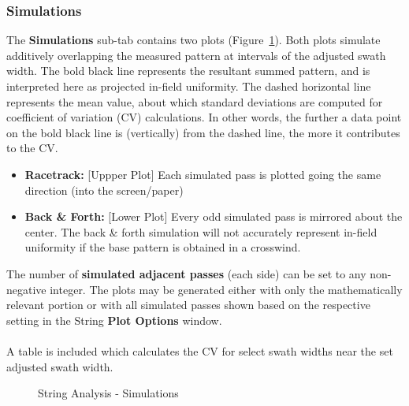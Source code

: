 \documentclass[10pt,letterpaper,titlepage]{article}
\begin{document}
    \subsubsection{Simulations}
    The \textbf{Simulations} sub-tab contains two plots (Figure~\ref{fig:string_simulations}). Both plots simulate additively overlapping the measured pattern at intervals of the adjusted swath width. The bold black line represents the resultant summed pattern, and is interpreted here as projected in-field uniformity. The dashed horizontal line represents the mean value, about which standard deviations are computed for coefficient of variation (CV) calculations. In other words, the further a data point on the bold black line is (vertically) from the dashed line, the more it contributes to the CV.
    \begin{itemize}
        \item \textbf{Racetrack:} [Uppper Plot] Each simulated pass is plotted going the same direction (into the screen/paper)
        \item \textbf{Back \& Forth:} [Lower Plot] Every odd simulated pass is mirrored about the center. \color{red} The back \& forth simulation will not accurately represent in-field uniformity if the base pattern is obtained in a crosswind. \color{black}
    \end{itemize}
    The number of \textbf{simulated adjacent passes} (each side) can be set to any non-negative integer. The plots may be generated either with only the mathematically relevant portion or with all simulated passes shown based on the respective setting in the String \textbf{Plot Options} window.
    \\\\
    A table is included which calculates the CV for select swath widths near the set adjusted swath width.
    \begin{figure}[hb]
        \centering
        \caption{String Analysis - Simulations}
        \label{fig:string_simulations}
    \end{figure}
    \newpage
\end{document}
